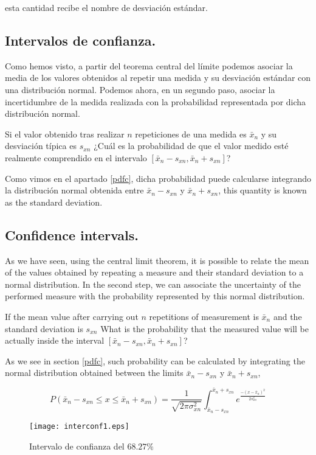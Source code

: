 \begin{paracol}{2}
esta cantidad recibe el nombre de desviación estándar.

\subsection{Intervalos de confianza.}
Como hemos visto, a partir del teorema central del límite podemos asociar la media de los valores obtenidos al repetir una medida y su desviación estándar con una distribución normal. Podemos ahora, en un segundo paso, asociar la incertidumbre de la medida realizada con la probabilidad representada por dicha distribución normal.

Si el valor obtenido tras realizar $n$ repeticiones de una medida es $\bar{x}_n$ y su desviación típica es $s_{xn}$ ¿Cuál es la probabilidad de que el valor medido esté realmente comprendido en el intervalo $[\bar{x}_n-s_{xn}, \bar{x}_n+s_{xn}]$? 

Como vimos en el apartado \ref{pdfc}, dicha probabilidad puede calcularse integrando la distribución normal obtenida entre $\bar{x}_n-s_{xn}$ y $\bar{x}_n+s_{xn}$,
\switchcolumn
this quantity is known as the standard deviation.

\subsection{Confidence intervals.}
As we have seen, using the central limit theorem, it is possible to relate the mean of the values obtained by repeating a measure and their standard deviation to a normal distribution. In the second step, we can associate the uncertainty of the performed measure with the probability represented by this normal distribution.

If the mean value after carrying out $n$ repetitions of measurement is $\bar{x}_n$ and the standard deviation is $s_{xn}$ What is the probability that the measured value will be actually inside the interval $[\bar{x}_n-s_{xn}, \bar{x}_n+s_{xn}]$? 

As we see in section \ref{pdfc}, such probability can be calculated by integrating the normal distribution obtained between the limits $\bar{x}_n-s_{xn}$ y $\bar{x}_n+s_{xn}$,
\end{paracol}
\begin{equation*}
P(\bar{x}_n - s_{xn} \leqslant x \leqslant \bar{x}_n
+ s_{xn}) = \frac{1}{\sqrt{2\pi\sigma^2_{xn}}}\int_{\bar{x}_n-s_{xn}}^{\bar{x}_n+s_{xn}}e^{\frac{-(x-\bar{x}_n)^2}{2s_{xn}^2}}
\end{equation*}
\begin{figure}[h]
\centering
\texttt{[image: interconf1.eps]}
\caption{Intervalo de confianza del $68.27\%$ }
\label{fig:ic1}
\end{figure}


